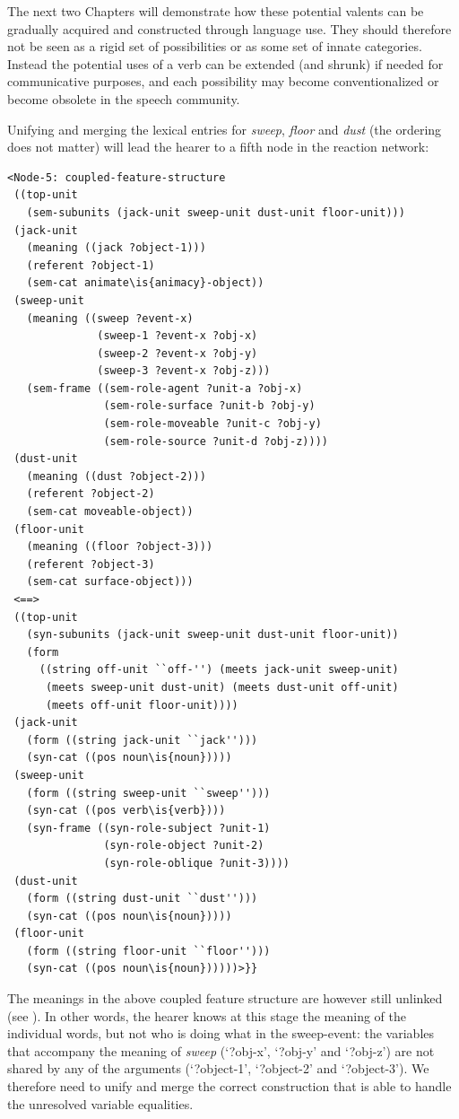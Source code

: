 The next two Chapters will demonstrate how these potential valents can be gradually acquired and constructed through language use. They should therefore not be seen as a rigid set of possibilities or as some set of innate categories. Instead the potential uses of a verb can be extended (and shrunk) if needed for communicative purposes, and each possibility may become conventionalized or become obsolete in the speech community.

Unifying and merging the lexical entries for {\em sweep}, {\em floor} and {\em dust} (the ordering does not matter) will lead the hearer to a fifth node in the reaction network:


\ea
\begin{lstlisting}
<Node-5: coupled-feature-structure
 ((top-unit
   (sem-subunits (jack-unit sweep-unit dust-unit floor-unit)))
 (jack-unit
   (meaning ((jack ?object-1)))
   (referent ?object-1)
   (sem-cat animate\is{animacy}-object))
 (sweep-unit
   (meaning ((sweep ?event-x)
              (sweep-1 ?event-x ?obj-x)
              (sweep-2 ?event-x ?obj-y)
              (sweep-3 ?event-x ?obj-z)))
   (sem-frame ((sem-role-agent ?unit-a ?obj-x)
               (sem-role-surface ?unit-b ?obj-y)
               (sem-role-moveable ?unit-c ?obj-y)
               (sem-role-source ?unit-d ?obj-z))))
 (dust-unit
   (meaning ((dust ?object-2)))
   (referent ?object-2)
   (sem-cat moveable-object))
 (floor-unit
   (meaning ((floor ?object-3)))
   (referent ?object-3)
   (sem-cat surface-object)))
 <==>
 ((top-unit
   (syn-subunits (jack-unit sweep-unit dust-unit floor-unit))
   (form 
     ((string off-unit ``off-'') (meets jack-unit sweep-unit)
      (meets sweep-unit dust-unit) (meets dust-unit off-unit)  
      (meets off-unit floor-unit))))
 (jack-unit
   (form ((string jack-unit ``jack'')))
   (syn-cat ((pos noun\is{noun}))))
 (sweep-unit
   (form ((string sweep-unit ``sweep'')))
   (syn-cat ((pos verb\is{verb})))
   (syn-frame ((syn-role-subject ?unit-1)
               (syn-role-object ?unit-2)
               (syn-role-oblique ?unit-3))))
 (dust-unit
   (form ((string dust-unit ``dust'')))
   (syn-cat ((pos noun\is{noun}))))
 (floor-unit
   (form ((string floor-unit ``floor'')))
   (syn-cat ((pos noun\is{noun})))))>}}

\end{lstlisting}
\z

The meanings in the above coupled feature structure are however still unlinked (see ). In other words, the hearer knows at this stage the meaning of the individual words, but not who is doing what in the sweep-event: the variables that accompany the meaning of {\em sweep} (`?obj-x', `?obj-y' and `?obj-z') are not shared by any of the arguments (`?object-1', `?object-2' and `?object-3'). We therefore need to unify and merge the correct construction that is able to handle the unresolved variable equalities.

